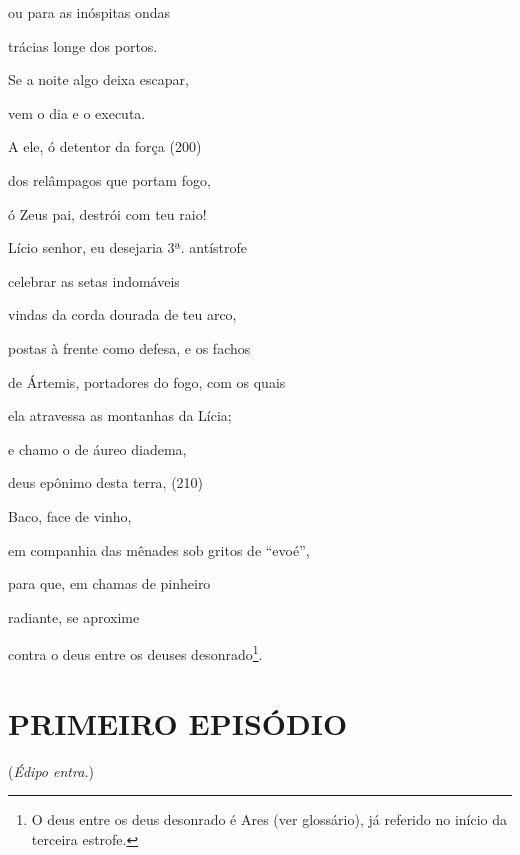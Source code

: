 ou para as inóspitas ondas

trácias longe dos portos.

Se a noite algo deixa escapar,

vem o dia e o executa.

A ele, ó detentor da força (200)

dos relâmpagos que portam fogo,

ó Zeus pai, destrói com teu raio!

Lício senhor, eu desejaria 3ª. antístrofe

celebrar as setas indomáveis

vindas da corda dourada de teu arco,

postas à frente como defesa, e os fachos

de Ártemis, portadores do fogo, com os quais

ela atravessa as montanhas da Lícia;

e chamo o de áureo diadema,

deus epônimo desta terra, (210)

Baco, face de vinho,

em companhia das mênades sob gritos de ``evoé'',

para que, em chamas de pinheiro

radiante, se aproxime

contra o deus entre os deuses desonrado\footnote{O deus entre os deus
  desonrado é Ares (ver glossário), já referido no início da terceira
  estrofe.}.

\section{PRIMEIRO EPISÓDIO}

(\emph{Édipo entra.})

